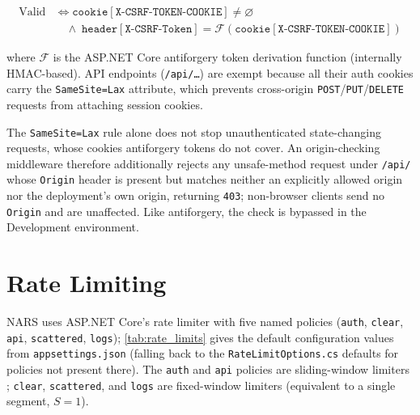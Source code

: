 \documentclass[12pt,a4paper]{article}
\theoremstyle{definition}
\theoremstyle{plain}
\theoremstyle{remark}
\begin{document}
\begin{equation}
  \begin{aligned}
    \text{Valid} &\iff
      \texttt{cookie}[\texttt{X-CSRF-TOKEN-COOKIE}] \neq \varnothing \\
    &\quad\land\;
      \texttt{header}[\texttt{X-CSRF-Token}]
      = \mathcal{F}\!\left(\texttt{cookie}[\texttt{X-CSRF-TOKEN-COOKIE}]\right)
  \end{aligned}
  \label{eq:csrf}
\end{equation}

where $\mathcal{F}$ is the ASP.NET Core antiforgery token derivation
function (internally HMAC-based). API endpoints (\texttt{/api/\ldots}) are
exempt because all their auth cookies carry the \texttt{SameSite=Lax} attribute,
which
prevents cross-origin \texttt{POST}/\texttt{PUT}/\texttt{DELETE} requests
from attaching session cookies.

The \texttt{SameSite=Lax} rule alone does not stop unauthenticated
state-changing requests, whose cookies antiforgery tokens do not cover.
An origin-checking middleware therefore additionally rejects any
unsafe-method request under \texttt{/api/} whose \texttt{Origin} header is
present but matches neither an explicitly allowed origin nor the
deployment's own origin, returning \texttt{403}; non-browser clients send
no \texttt{Origin} and are unaffected. Like antiforgery, the check is
bypassed in the Development environment.

\section{Rate Limiting}
\label{sec:ratelimit}

NARS uses ASP.NET Core's rate limiter with five named policies
(\texttt{auth}, \texttt{clear}, \texttt{api}, \texttt{scattered},
\texttt{logs}); \cref{tab:rate_limits} gives the default configuration
values from \texttt{appsettings.json} (falling back to the
\texttt{RateLimitOptions.cs} defaults for policies not present there).
The \texttt{auth} and \texttt{api} policies are sliding-window limiters \cite{sliding_window};
\texttt{clear}, \texttt{scattered}, and \texttt{logs} are fixed-window
limiters (equivalent to a single segment, $S = 1$).
\end{document}
